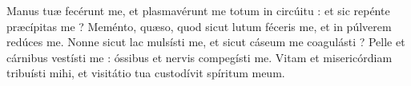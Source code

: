 \lettrine{M}{}anus tuæ fecérunt me, et plasmavérunt me totum in circúitu : et sic repénte præcípitas me ?
Meménto, quæso, quod sicut lutum féceris me, et in púlverem redúces me.
Nonne sicut lac mulsísti me, et sicut cáseum me coagulásti ?
Pelle et cárnibus vestísti me : óssibus et nervis compegísti me.
Vitam et misericórdiam tribuísti mihi, et visitátio tua custodívit spíritum meum.